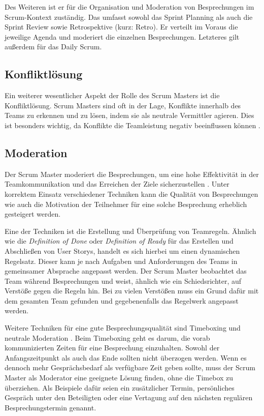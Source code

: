 \documentclass[5pt, final]{beamer}
\begin{document}
\begin{frame}[t]
\begin{multicols}{3}
			Des Weiteren ist er für die Organisation und Moderation von Besprechungen im Scrum-Kontext zuständig.
			Das umfasst sowohl das Sprint Planning als auch die Sprint Review sowie Retrospektive (kurz: Retro).
			Er verteilt im Voraus die jeweilige Agenda und moderiert die einzelnen Besprechungen.
			Letzteres gilt außerdem für das Daily Scrum.
			
			\subsection{Konfliktlösung}
			
			Ein weiterer wesentlicher Aspekt der Rolle des Scrum Masters ist die Konfliktlösung. Scrum Masters sind oft in der Lage, Konflikte innerhalb des Teams zu erkennen und zu lösen, indem sie als neutrale Vermittler agieren. Dies ist besonders wichtig, da Konflikte die Teamleistung negativ beeinflussen können \cite{Noll17}.
			
			\subsection{Moderation}
			
			Der Scrum Master moderiert die Besprechungen, um eine hohe Effektivität in der Teamkommunikation und das Erreichen der Ziele sicherzustellen \cite{vantighem24}.
			Unter korrektem Einsatz verschiedener Techniken kann die Qualität von Besprechungen wie auch die Motivation der Teilnehmer für eine solche Besprechung erheblich gesteigert werden.
			
			Eine der Techniken ist die Erstellung und Überprüfung von Teamregeln.
			Ähnlich wie die \textit{Definition of Done} oder \textit{Definition of Ready} für das Erstellen und Abschließen von User Storys, handelt es sich hierbei um einen dynamischen Regelsatz.
			Dieser kann je nach Aufgaben und Anforderungen des Teams in gemeinsamer Absprache angepasst werden.
			Der Scrum Master beobachtet das Team während Besprechungen und weist, ähnlich wie ein Schiedsrichter, auf Verstöße gegen die Regeln hin.
			Bei zu vielen Verstößen muss ein Grund dafür mit dem gesamten Team gefunden und gegebenenfalls das Regelwerk angepasst werden.
			
            Weitere Techniken für eine gute Besprechungsqualität sind Timeboxing und neutrale Moderation \cite[S. 23ff.]{malten24}.
            Beim Timeboxing geht es darum, die vorab kommunizierten Zeiten für eine Besprechung einzuhalten.
            Sowohl der Anfangszeitpunkt als auch das Ende sollten nicht überzogen werden.
            Wenn es dennoch mehr Gesprächsbedarf als verfügbare Zeit geben sollte, muss der Scrum Master als Moderator eine geeignete Lösung finden, ohne die Timebox zu überziehen.
            Als Beispiele dafür seien ein zusätzlicher Termin, persönliches Gespräch unter den Beteiligten oder eine Vertagung auf den nächsten regulären Besprechungstermin genannt.
            

\end{multicols}
\end{frame}
\end{document}
